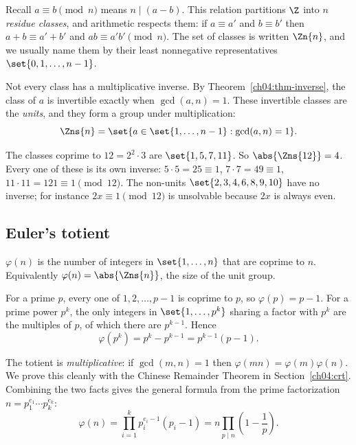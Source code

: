 Recall $a \equiv b \pmod n$ means $n \mid (a - b)$. This relation partitions $\Z$ into $n$
\emph{residue classes}, and arithmetic respects them: if $a \equiv a'$ and $b \equiv b'$ then
$a + b \equiv a' + b'$ and $ab \equiv a'b' \pmod n$. The set of classes is written $\Zn{n}$, and we
usually name them by their least nonnegative representatives $\set{0, 1, \dots, n-1}$.

Not every class has a multiplicative inverse. By Theorem~\ref{ch04:thm-inverse}, the class of $a$ is
invertible exactly when $\gcd(a, n) = 1$. These invertible classes are the \emph{units}, and they
form a group under multiplication:
\[
  \Zns{n} = \set{a \in \set{1, \dots, n-1} : \gcd(a, n) = 1}.
\]

\begin{example}
\label{ch04:ex-units-12}
The classes coprime to $12 = 2^2 \cdot 3$ are $\set{1, 5, 7, 11}$. So $\abs{\Zns{12}} = 4$. Every
one of these is its own inverse: $5 \cdot 5 = 25 \equiv 1$, $7 \cdot 7 = 49 \equiv 1$,
$11 \cdot 11 = 121 \equiv 1 \pmod{12}$. The non-units $\set{2,3,4,6,8,9,10}$ have no inverse; for
instance $2 x \equiv 1 \pmod{12}$ is unsolvable because $2x$ is always even.
\end{example}

\subsection*{Euler's totient}

\begin{definition}
\label{ch04:def-totient}
$\varphi(n)$ is the number of integers in $\set{1, \dots, n}$ that are coprime to $n$. Equivalently
$\varphi(n) = \abs{\Zns{n}}$, the size of the unit group.
\end{definition}

For a prime $p$, every one of $1, 2, \dots, p-1$ is coprime to $p$, so $\varphi(p) = p - 1$. For a
prime power $p^k$, the only integers in $\set{1, \dots, p^k}$ sharing a factor with $p^k$ are the
multiples of $p$, of which there are $p^{k-1}$. Hence
\[
  \varphi(p^k) = p^k - p^{k-1} = p^{k-1}(p - 1).
\]

The totient is \emph{multiplicative}: if $\gcd(m, n) = 1$ then $\varphi(mn) = \varphi(m)\varphi(n)$.
We prove this cleanly with the Chinese Remainder Theorem in Section~\ref{ch04:crt}. Combining the
two facts gives the general formula from the prime factorization
$n = p_1^{e_1} \cdots p_k^{e_k}$:
\[
  \varphi(n) = \prod_{i=1}^{k} p_i^{e_i - 1}(p_i - 1)
             = n \prod_{p \mid n}\left(1 - \frac{1}{p}\right).
\]

